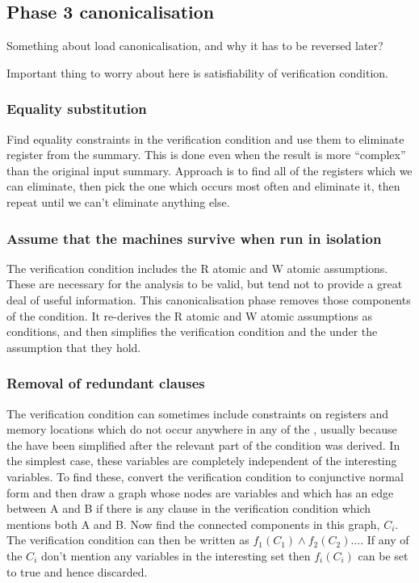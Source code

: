 \subsection{Phase 3 canonicalisation}

Something about load canonicalisation, and why it has to be reversed later?

Important thing to worry about here is satisfiability of verification condition.

\subsubsection{Equality substitution}
Find equality constraints in the verification condition and use them to eliminate register from the summary.
This is done even when the result is more ``complex'' than the original input summary.
Approach is to find all of the registers which we can eliminate, then pick the one which occurs most often and eliminate it, then repeat until we can't eliminate anything else.


\subsubsection{Assume that the machines survive when run in isolation}
The verification condition includes the R atomic and W atomic assumptions.
These are necessary for the analysis to be valid, but tend not to provide a great deal of useful information.
This canonicalisation phase removes those components of the condition.
It re-derives the R atomic and W atomic assumptions as conditions, and then simplifies the verification condition and the \StateMachines under the assumption that they hold.

\subsubsection{Removal of redundant clauses}
The verification condition can sometimes include constraints on registers and memory locations which do not occur anywhere in any of the \StateMachines, usually because the \StateMachines have been simplified after the relevant part of the condition was derived.
In the simplest case, these variables are completely independent of the interesting variables.
To find these, convert the verification condition to conjunctive normal form and then draw a graph whose nodes are variables and which has an edge between A and B if there is any clause in the verification condition which mentions both A and B.
Now find the connected components in this graph, $C_i$.
The verification condition can then be written as $f_1(C_1) \wedge f_2(C_2) \ldots$.
If any of the $C_i$ don't mention any variables in the interesting set then $f_i(C_i)$ can be set to true and hence discarded.

